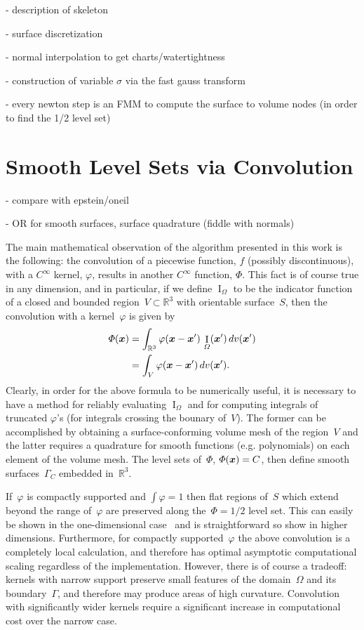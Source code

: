 \documentclass[11pt]{article}
\numberwithin{equation}{section}
\newcommand{\vct}{\vectorsym}
\DeclareMathOperator\indic{I}
\newcommand\bbR{\mathbb R}
\newcommand\bx{\vct{x}}
\renewcommand{\phi}{\varphi}
\begin{document}
- description of skeleton

- surface discretization

- normal interpolation to get charts/watertightness

- construction of variable $\sigma$ via the fast gauss transform

- every newton step is an FMM to compute the surface to volume nodes
(in order to find the 1/2 level set)



\section{Smooth Level Sets via Convolution}



- compare with epstein/oneil



- OR for smooth surfaces, surface quadrature (fiddle with normals)



The main mathematical observation of the algorithm presented in this
work is the following: the convolution of a piecewise function, $f$
(possibly discontinuous), with a $C^\infty$ kernel, $\phi$, results in
another $C^\infty$ function, $\Phi$. This fact is of course true in any
dimension, and in particular, if we define $\indic_\Omega$ to be the
indicator function of a closed and bounded
region~$V \subset \bbR^3$ with orientable surface~$S$, then
the convolution with a kernel~$\phi$ is given by
\begin{equation}
\begin{aligned}
\Phi(\bx) &= \int_{\bbR^3} \phi(\bx-\bx') \, \indic_\Omega(\bx') \, dv(\bx') \\
 &= \int_{V} \phi(\bx-\bx')  \, dv(\bx').
\end{aligned}
\end{equation}
Clearly, in order for the above formula to be numerically useful, it
is necessary to have a method for reliably evaluating $\indic_\Omega$
and for computing integrals of truncated $\phi$'s (for integrals
crossing the bounary of~$V$). The former can be
accomplished by obtaining a surface-conforming volume mesh of the
region~$V$ and the latter requires a quadrature for smooth
functions (e.g. polynomials) on each element of the volume mesh. The
level sets of~$\Phi$, $\Phi(\bx) = C$, then define smooth
surfaces~$\Gamma_C$ embedded in~$\bbR^3$.

If~$\phi$ is compactly supported and $\int \phi = 1$ then flat regions
of~$S$ which extend beyond the range of~$\phi$ are preserved
along the~$\Phi = 1/2$ level set. This can easily be shown in the
one-dimensional case~\cite{epstein_2016} and is straightforward so
show in higher dimensions. Furthermore, for compactly supported~$\phi$
the above convolution is a completely local calculation, and therefore
has optimal asymptotic computational scaling regardless of the
implementation. However, there is of course a tradeoff: kernels with
narrow support preserve small features of the domain~$\Omega$ and its
boundary~$\Gamma$, and therefore may produce areas of high
curvature. Convolution with significantly wider kernels require a
significant increase in computational cost over the narrow case.
\end{document}
